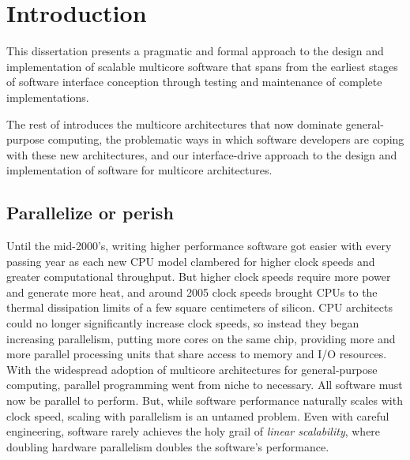 \section{Introduction}
\label{sec:intro}



This dissertation presents a pragmatic and formal approach to the
design and implementation of scalable multicore software that spans
from the earliest stages of software interface conception through
testing and maintenance of complete implementations.

The rest of  introduces the multicore
architectures that now dominate general-purpose computing, the
problematic ways in which software developers are coping with these
new architectures, and our interface-drive approach to the design and
implementation of software for multicore architectures.


\subsection{Parallelize or perish}

Until the mid-2000's, writing higher performance software got easier
with every passing year as each new CPU model clambered for higher
clock speeds and greater computational throughput.
%
But higher clock speeds require more power and generate more heat, and
around 2005 clock speeds brought CPUs to the thermal dissipation
limits of a few square centimeters of silicon.
%
CPU architects could no longer significantly increase clock speeds, so
instead they began increasing parallelism, putting more cores on the
same chip, providing more and more parallel processing units that
share access to memory and I/O resources.
%
With the widespread adoption of multicore architectures for
general-purpose computing, parallel programming went from niche to
necessary.
%
All software must now be parallel to perform.
%
But, while software performance naturally scales with clock speed,
scaling with parallelism is an untamed problem.  Even with careful
engineering, software rarely achieves the holy grail of \emph{linear
  scalability}, where doubling hardware parallelism doubles the
software's performance.

